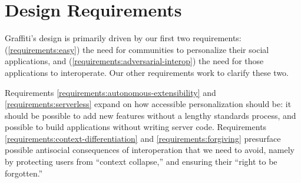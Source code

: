 \newtheorem{requirement}{Requirement}

\section{Design Requirements}
\label{requirements}

Graffiti's design is primarily driven by our
first two requirements:
(\ref{requirements:easy})
the need for communities to personalize
their social applications,
and (\ref{requirements:adversarial-interop})
the need for those applications to interoperate.
Our other requirements work to clarify these two.

Requirements \ref{requirements:autonomous-extensibility}
and \ref{requirements:serverless} expand on how accessible
personalization should be: it should be possible to add new features
without a lengthy standards process, and possible to build
applications without writing server code.
Requirements \ref{requirements:context-differentiation}
and \ref{requirements:forgiving}
presurface possible antisocial consequences of
interoperation that we need to avoid,
namely by protecting users from ``context collapse,''
and ensuring their ``right to be forgotten.''







